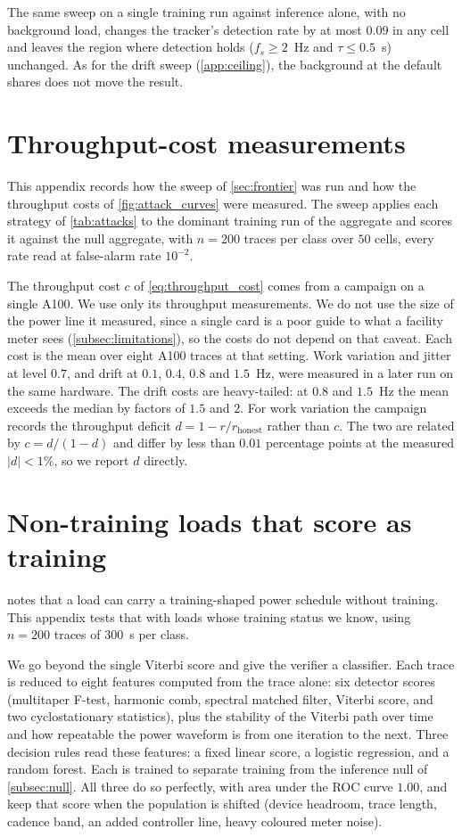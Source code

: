 \documentclass{article}
\begin{document}
The same sweep on a single training run against
inference alone, with no background load, changes the tracker's detection rate
by at most $0.09$ in any cell and leaves the region where detection holds
($f_s \ge 2$~Hz and $\tau \le 0.5$~s) unchanged. As for the drift sweep
(\cref{app:ceiling}), the background at the default shares does not move the
result.

\section{Throughput-cost measurements}
\label{app:sweep}

This appendix records how the sweep of \cref{sec:frontier} was run and how the
throughput costs of \cref{fig:attack_curves} were measured. The sweep applies
each strategy of \cref{tab:attacks} to the dominant training run of the
aggregate and scores it against the null aggregate, with $n=200$ traces per
class over $50$ cells, every rate read at false-alarm rate
$10^{-2}$.

The throughput cost $c$ of \cref{eq:throughput_cost} comes from a campaign on a
single A100. We use only its
throughput measurements. We do not use the size of the power line it measured,
since a single card is a poor guide to what a facility meter sees
(\cref{subsec:limitations}), so the costs do not depend on that caveat. Each
cost is the mean over eight A100 traces at that setting. Work variation and
jitter at level $0.7$, and drift at $0.1$, $0.4$, $0.8$ and $1.5$~Hz, were
measured in a later run on the same hardware. The drift costs are
heavy-tailed: at $0.8$ and $1.5$~Hz the mean exceeds the median by factors of
$1.5$ and $2$. For work variation the campaign records the throughput deficit
$d = 1 - r/r_{\mathrm{honest}}$ rather than $c$. The two are related by
$c = d/(1-d)$ and differ by less than $0.01$ percentage points at the measured
$|d| < 1\%$, so we report $d$ directly.

\section{Non-training loads that score as training}
\label{app:rung2}

 notes that a load can carry a training-shaped
power schedule without training. This appendix tests that with loads whose
training status we know, using $n=200$ traces of $300$~s per class.

We go beyond the single Viterbi score and give the verifier a
classifier. Each trace is reduced to eight features computed from the trace
alone: six detector scores (multitaper F-test, harmonic comb, spectral matched
filter, Viterbi score, and two cyclostationary statistics), plus the stability of
the Viterbi path over time and how repeatable the power waveform is from one
iteration to the next. Three decision rules read these features: a fixed linear
score, a logistic regression, and a random forest. Each is trained to separate
training from the inference null of \cref{subsec:null}. All three do so
perfectly, with area under the ROC curve $1.00$, and keep that score when the
population is shifted (device headroom, trace length, cadence band, an added
controller line, heavy coloured meter noise).
\end{document}
